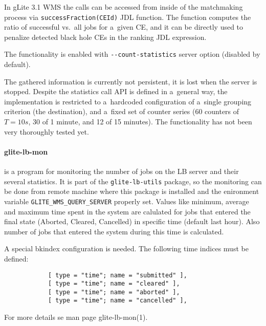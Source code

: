 \begin{sloppypar}
In gLite 3.1 WMS the calls can be accessed from inside of the matchmaking process
via \verb'successFraction(CEId)'
JDL function.
The function computes the ratio of successful vs.\ all jobs for a~given CE,
and it can be directly used to penalize detected black hole CEs in the ranking
JDL expression.
\end{sloppypar}


The functionality is enabled with \verb'--count-statistics' \LB server option
(disabled by default).

The gathered information is currently not persistent, it is lost when the server is stopped.
Despite the statistics call API is defined in a~general way, the implementation is
restricted to a~hardcoded configuration of a~single grouping criterion (the destination),
and a~fixed set of counter series (60 counters of $T=10s$, 30 of 1 minute, and 12 of 15 minutes).
The functionality has not been very thoroughly tested yet.




\paragraph{glite-lb-mon} is a program for monitoring the number of jobs on the
LB server and their several statistics. It is part of the
\verb'glite-lb-utils' package, so the monitoring can be done from remote machine
where this package is installed and the enironment variable
\verb'GLITE_WMS_QUERY_SERVER' properly set. Values like minimum, average and
maximum time spent in the system are calulated for jobs that entered  the
final  state (Aborted,  Cleared,  Cancelled) in specific time (default last
hour). Also number of jobs that entered the system during this time is
calculated.

A special bkindex configuration is needed. 
The following time indices must be defined:
\begin{verbatim}
            [ type = "time"; name = "submitted" ],
            [ type = "time"; name = "cleared" ],
            [ type = "time"; name = "aborted" ],
            [ type = "time"; name = "cancelled" ],
\end{verbatim}
For more details se man page glite-lb-mon(1).


